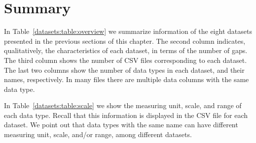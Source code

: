 
\vspace{-15pt}
\section{Summary}
\label{datasets:summary}


\vspace{-5pt}
In Table~\ref{datasets:table:overview} we summarize information of the eight datasets presented in the previous sections of this chapter. The second column indicates, qualitatively, the characteristics of each dataset, in terms of the number of gaps. The third column shows the number of CSV files corresponding to each dataset. The last two columns show the number of data types in each dataset, and their names, respectively. In many files there are multiple data columns with the same data type.





\clearpage


In Table~\ref{datasets:table:scale} we show the measuring unit, scale, and range of each data type. Recall that this information is displayed in the CSV file for each dataset.  We point out that data types with the same name can have different measuring unit, scale, and/or range, among different datasets. 

\vspace{+5pt}


